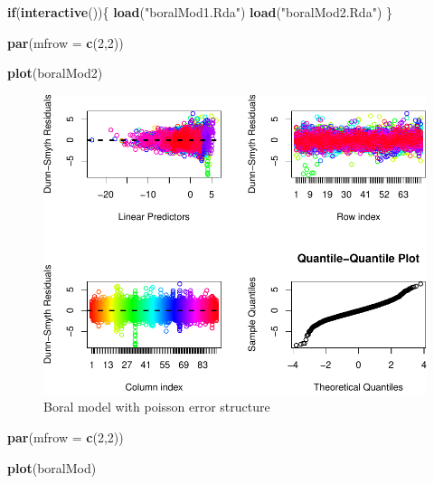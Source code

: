 \documentclass[nofonts,]{tufte-handout}
\newenvironment{Shaded}{\begin{snugshade}}{\end{snugshade}}
\newcommand{\AttributeTok}[1]{\textcolor[rgb]{0.13,0.29,0.53}{#1}}
\newcommand{\ControlFlowTok}[1]{\textcolor[rgb]{0.13,0.29,0.53}{\textbf{#1}}}
\newcommand{\DecValTok}[1]{\textcolor[rgb]{0.00,0.00,0.81}{#1}}
\newcommand{\FunctionTok}[1]{\textcolor[rgb]{0.13,0.29,0.53}{\textbf{#1}}}
\newcommand{\NormalTok}[1]{#1}
\newcommand{\StringTok}[1]{\textcolor[rgb]{0.31,0.60,0.02}{#1}}
\begin{document}
\begin{Shaded}
\begin{Highlighting}[]
\ControlFlowTok{if}\NormalTok{(}\FunctionTok{interactive}\NormalTok{())\{}
  \FunctionTok{load}\NormalTok{(}\StringTok{"boralMod1.Rda"}\NormalTok{)}
  \FunctionTok{load}\NormalTok{(}\StringTok{"boralMod2.Rda"}\NormalTok{)}
\NormalTok{\} }
\end{Highlighting}
\end{Shaded}

\begin{Shaded}
\begin{Highlighting}[]
\FunctionTok{par}\NormalTok{(}\AttributeTok{mfrow =} \FunctionTok{c}\NormalTok{(}\DecValTok{2}\NormalTok{,}\DecValTok{2}\NormalTok{))}

\FunctionTok{plot}\NormalTok{(boralMod2)}
\end{Highlighting}
\end{Shaded}

\begin{figure}
\includegraphics{Technical-supplement_files/figure-latex/boralModPlot-1} \caption[Boral model with poisson error structure]{Boral model with poisson error structure}\label{fig:boralModPlot}
\end{figure}

\begin{Shaded}
\begin{Highlighting}[]
\FunctionTok{par}\NormalTok{(}\AttributeTok{mfrow =} \FunctionTok{c}\NormalTok{(}\DecValTok{2}\NormalTok{,}\DecValTok{2}\NormalTok{))}

\FunctionTok{plot}\NormalTok{(boralMod)}
\end{Highlighting}
\end{Shaded}
\end{document}
